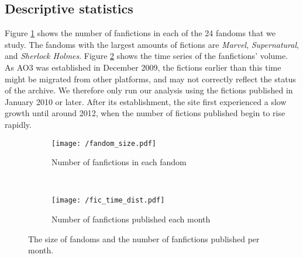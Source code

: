 \documentclass[a4paper]{article}
\begin{document}
\subsection*{Descriptive statistics}

Figure \ref{fig:fandom_size} shows the number of fanfictions in each of the 24 fandoms that we study. The fandoms with the largest amounts of fictions are \emph{Marvel}, \emph{Supernatural}, and \emph{Sherlock Holmes}. Figure \ref{fig:fic_time_dist}  shows the time series of the fanfictions' volume. As AO3 was established in December 2009, the fictions earlier than this time might be migrated from other platforms, and may not correctly reflect the status of the archive. We therefore only run our analysis using the fictions published in January 2010 or later. After its establishment, the site first experienced a slow growth until around 2012, when the number of fictions published begin to rise rapidly. 

\begin{figure}
    \centering
    \begin{subfigure}[b]{\textwidth}
        \texttt{[image: /fandom\_size.pdf]}
        \caption{Number of fanfictions in each fandom}
        \label{fig:fandom_size}
    \end{subfigure}
    ~ %
    \begin{subfigure}[b]{0.8\textwidth}
        \texttt{[image: /fic\_time\_dist.pdf]}
        \caption{Number of fanfictions published each month}
        \label{fig:fic_time_dist}
    \end{subfigure}
    \caption{The size of fandoms and the number of fanfictions published per month.}\label{fig:stats_size_time}
\end{figure}
\end{document}
